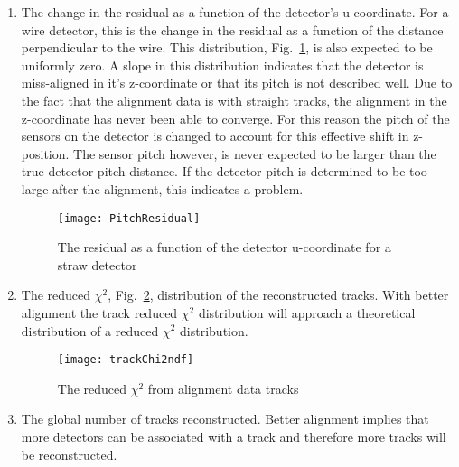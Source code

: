 \begin{enumerate}[label=\roman*)]
\item The change in the residual as a function of the detector's u-coordinate.
  For a wire detector, this is the change in the residual as a function of the
  distance perpendicular to the wire.  This distribution,
  Fig.~\ref{fig::PitchResidual}, is also expected to be uniformly zero.  A slope
  in this distribution indicates that the detector is miss-aligned in it's
  z-coordinate or that its pitch is not described well.  Due to the fact that
  the alignment data is with straight tracks, the alignment in the z-coordinate
  has never been able to converge.  For this reason the pitch of the sensors on
  the detector is changed to account for this effective shift in z-position.
  The sensor pitch however, is never expected to be larger than the true
  detector pitch distance.  If the detector pitch is determined to be too large
  after the alignment, this indicates a problem.
  \begin{figure}[h!t]
    \centering \texttt{[image: PitchResidual]}
    \caption{The residual as a function of the detector u-coordinate for a straw
      detector}
    \label{fig::PitchResidual}
  \end{figure}

\item The reduced $\chi^2$, Fig.~\ref{fig::trackChi2ndf}, distribution of the
  reconstructed tracks.  With better alignment the track reduced $\chi^2$
  distribution will approach a theoretical distribution of a reduced $\chi^2$
  distribution.
  \begin{figure}[h!t]
    \centering \texttt{[image: trackChi2ndf]}
    \caption{The reduced $\chi^2$ from alignment data tracks}
    \label{fig::trackChi2ndf}
  \end{figure}
  
\item The global number of tracks reconstructed.  Better alignment
  implies that more detectors can be associated with a track and therefore more
  tracks will be reconstructed.
\end{enumerate}
